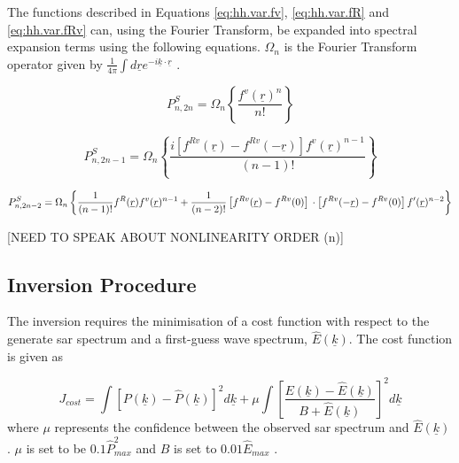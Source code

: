 The functions described in Equations \ref{eq:hh.var.fv}, \ref{eq:hh.var.fR} and \ref{eq:hh.var.fRv} can, using the Fourier Transform, be expanded into spectral expansion terms using the following equations. $\Omega_n$ is the Fourier Transform operator given by $\frac{1}{4\pi}\int d\underline{r}e^{-i\underline{k}\cdot \underline{r}}$ \cite{Hasselmann1991}.

\begin{equation} \label{eq:hh.ft.2n}
    P^S_{n,2n} = \Omega_n \left \{ \frac{f^v(\underline{r})^n}{n!} \right \}
\end{equation}

\begin{equation} \label{eq:hh.ft.2n-1}
    P^S_{n,2n-1} = \Omega_n \left \{ \frac{i\left [ f^{Rv}(\underline{r}) - f^{Rv}(-\underline{r}) \right ] f^v(\underline{r})^{n-1}}{(n-1)!} \right \}
\end{equation}

\begin{equation} \label{eq:hh.ft.2n-2}
    P^S_{n,2n-2} = \Omega_n \left \{ \frac{1}{(n-1)!} f^R(\underline{r}) f^v(\underline{r})^{n-1} + \frac{1}{(n-2)!} \left [ f^{Rv}(\underline{r}) - f^{Rv}(0) \right ] \\ 
    \cdot \left [ f^{Rv}(-\underline{r}) - f^{Rv}(0) \right ] f'(\underline{r})^{n-2}  \right \}
\end{equation}

[NEED TO SPEAK ABOUT NONLINEARITY ORDER (n)]

\subsection{Inversion Procedure} \label{subsec:theory.hasselmann.inversion}
The inversion requires the minimisation of a cost function \cite{Hasselmann1991} with respect to the generate \acs{sar} spectrum and a first-guess wave spectrum, $\hat{E}(\underline{k})$. The cost function is given as

\begin{equation} \label{eq:hh.inversion.J}
    J_{cost} = \int \left [ P(\underline{k}) - \hat{P}(\underline{k}) \right ]^2 d\underline{k} + \mu \int \left [ \frac{ E(\underline{k}) - \hat{E}(\underline{k})}{B+\hat{E}(\underline{k})} \right ]^2d\underline{k}
\end{equation}
where $\mu$ represents the confidence between the observed \acs{sar} spectrum and $\hat{E}(\underline{k})$. $\mu$ is set to be $0.1\hat{P}_{max}^2$ and $B$ is set to $0.01\hat{E}_{max}$ \cite{Hasselmann1991}. 


